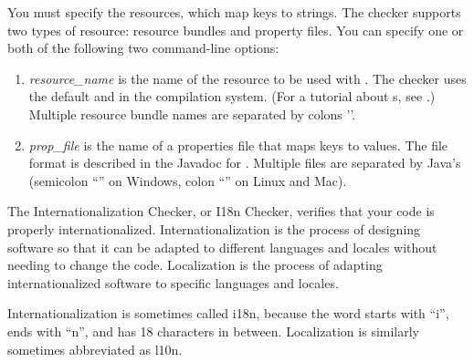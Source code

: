 You must specify the resources, which map keys to strings.
The checker supports two types of resource:
resource bundles and property files.  You can specify one or both of the
following two command-line options:

\begin{enumerate}

\item {}

  \emph{resource\_name} is the name of the resource to be used with
  .
  The checker uses the default  and  in the
  compilation system.
  (For a tutorial about s, see
  .)
  Multiple resource bundle names are separated by colons '\code{:}'.

\item {}

  \emph{prop\_file} is the name of a properties file that maps
  keys to values.  The file format is described in
  the Javadoc for
  .
  Multiple files are separated by Java's
  (semicolon ``\code{;}'' on Windows, colon ``\code{:}'' on Linux and
  Mac).

\end{enumerate}




The Internationalization Checker, or I18n Checker, verifies that your code is properly
internationalized.  Internationalization is the process of designing software so that
it can be adapted to different languages and locales without needing to change the code.
Localization is the process of adapting internationalized software to specific languages
and locales.

Internationalization is sometimes called i18n, because the word starts with ``i'',
ends with ``n'', and has 18 characters in between.  Localization is similarly
sometimes abbreviated as l10n.

